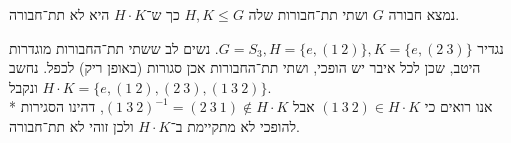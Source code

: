 \Subquestion{}
נמצא חבורה $G$ ושתי תת־חבורות שלה $H, K \le G$ כך ש־$H \cdot K$ היא לא תת־חבורה.

נגדיר $G = S_3, H = \{e, (1\ 2) \}, K = \{e, (2\ 3)\}$. 
נשים לב ששתי תת־החבורות מוגדרות היטב, שכן לכל איבר יש הופכי, ושתי תת־החבורות אכן סגורות (באופן ריק) לכפל.
נחשב ונקבל $H \cdot K = \{ e, (1\ 2), (2\ 3), (1\ 3\ 2)\}$. \\*
אנו רואים כי $(1\ 3\ 2) \in H \cdot K$ אבל ${(1\ 3\ 2)}^{-1} = (2\ 3\ 1) \notin H \cdot K$, דהינו הסגירות להופכי לא מתקיימת ב־$H \cdot K$ ולכן זוהי לא תת־חבורה.


